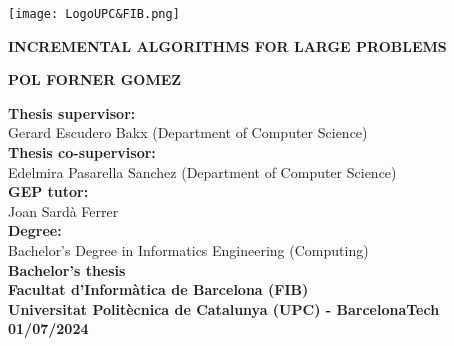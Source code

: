 \begin{titlepage}
    \centering

    \vspace*{1cm}
    \texttt{[image: LogoUPC\&FIB.png]}

    \vspace*{2cm}
    {\huge \textbf{INCREMENTAL ALGORITHMS FOR LARGE PROBLEMS}}

    \vspace*{.5cm}


    \vspace{2cm}

    \LARGE

    \begin{minipage}{.5\textwidth}
        \centering
        \textbf{POL FORNER GOMEZ}
    \end{minipage}

    \large

    \vfill

    \textbf{Thesis supervisor:}  \\ Gerard Escudero Bakx (Department of Computer Science) \\
    \textbf{Thesis co-supervisor:}  \\ Edelmira Pasarella Sanchez (Department of Computer Science) \\
    \textbf{GEP tutor:}  \\ Joan Sardà Ferrer \\
    \textbf{Degree:}  \\ Bachelor's Degree in Informatics Engineering (Computing) \\
    
    \textbf{Bachelor's thesis} \\
    \textbf{Facultat d'Informàtica de Barcelona (FIB)} \\
    \textbf{Universitat Politècnica de Catalunya (UPC) - BarcelonaTech} \\
    \textbf{01/07/2024} 
\end{titlepage}